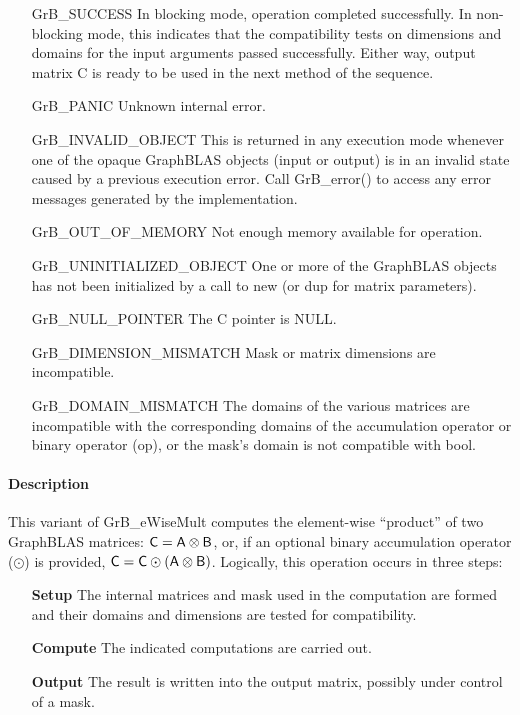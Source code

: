 \begin{itemize}[leftmargin=2.1in]
    \item[{\sf GrB\_SUCCESS}]         In blocking mode, operation completed
    successfully. In non-blocking mode, this indicates that the compatibility 
    tests on dimensions and domains for the input arguments passed successfully. 
    Either way, output matrix {\sf C} is ready to be used in the next method of 
    the sequence.

    \item[{\sf GrB\_PANIC}]           Unknown internal error.
    
    \item[{\sf GrB\_INVALID\_OBJECT}] This is returned in any execution mode 
    whenever one of the opaque GraphBLAS objects (input or output) is in an invalid 
    state caused by a previous execution error.  Call {GrB\_error()} to access 
    any error messages generated by the implementation.

    \item[{\sf GrB\_OUT\_OF\_MEMORY}] Not enough memory available for operation.
    
    \item[{\sf GrB\_UNINITIALIZED\_OBJECT}] One or more of the GraphBLAS objects 
    has not been initialized by a call to {\sf new} (or {\sf dup} for matrix
    parameters).
    
    \item[{\sf GrB\_NULL\_POINTER}]  The {\sf C} pointer is {\sf NULL}.

    \item[{\sf GrB\_DIMENSION\_MISMATCH}] Mask or matrix dimensions are incompatible.

	\item[{\sf GrB\_DOMAIN\_MISMATCH}]    The domains of the various
	matrices are incompatible with the corresponding domains of the
	accumulation operator or binary operator ({\sf op}), or the mask's domain 
    is not compatible with bool.
\end{itemize}

\paragraph{Description}

This variant of {\sf GrB\_eWiseMult} computes the element-wise ``product'' of
two GraphBLAS matrices: ${\sf C} = {\sf A} \otimes {\sf B}$, or, if an optional
binary accumulation operator ($\odot$) is provided, ${\sf C} = {\sf C} \odot
\left({\sf A} \otimes {\sf B}\right)$.  Logically, this operation occurs in
three steps:
\begin{enumerate}[leftmargin=0.75in]
\item[\bf Setup] The internal matrices and mask used in the computation are formed 
and their domains and dimensions are tested for compatibility.
\item[\bf Compute] The indicated computations are carried out.
\item[\bf Output] The result is written into the output matrix, possibly under 
control of a mask.
\end{enumerate}

